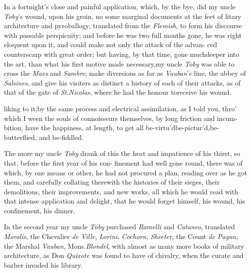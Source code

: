 \documentclass{article}
\begin{document}
In a fortnight’s close and painful application, which, by
the bye, did my uncle \textit{Toby}’s wound, upon his groin, no
some marginal documents at the feet of 
litary architecture and pyroballogy, tran\-slated from the
\textit{Flemish}, to form his dis\-course with passable perspicuity;
and\break 
before he was two full months gone,\tsk\break
he was right eloquent upon it, and could make not only the
attack of the advan-
ced counterscarp with great order;\tsh\break 
but having, by that time, gone much\break deeper into
the art, than what his first motive made necessary,\tsk my uncle \textit{Toby} was able
to cross the \textit{Maes} and \textit{Sambre}; make diversions as far as
\textit{Vauban}’s line, the abbey of \textit{Salsines}, \etc and give his visiters
as distinct a history of each of their attacks, as of that of the gate of
\textit{St.\@ Nicolas}, where he had the honour to\break receive his wound.

\noindent
{}
liking to it;\tsk by the same process and\break
electrical assimilation, as I told you, thro’\break
which I ween the souls of connoisseurs\break
themselves, by long friction and incum-\break
bition, have the happiness, at length, to get all
be-virtu’d\tsk be-pictur’d,\tsk be-butterflied, and
be-fiddled.

The more my uncle \textit{Toby} drank of this\break
{}
the heat and impatience of his thirst,\break
so that, before the first year of his con-\break
finement had well gone round, there was\break
{}
of which, by one means or other, he had not
procured a plan, reading over as he got them, and carefully
collating therewith the histories of their sieges, their
demolitions, their improvements, and new works, all which he
would read with that intense application and delight, that he
would forget himself, his wound, his confinement, his dinner.

In the second year my uncle \textit{Toby} purchased \textit{Ramelli}
and \textit{Cataneo}, translated
\textit{Moralis}, the Chevalier \textit{de Ville}, \textit{Lorini},\break 
\textit{Cochorn}, \textit{Sheeter}, the Count \textit{de Pagan},\break 
the Marshal \textit{Vauban}, Mons.\@ \textit{Blondel}, with\break
almost as many more books of military architecture, as Don
\textit{Quixote} was found to have of chivalry, when the
curate and\break
barber invaded his library.
\end{document}
